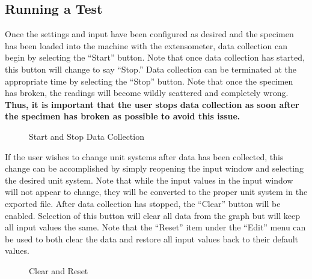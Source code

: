 \documentclass[12pt,letterpaper, USenglish]{article}
\theoremstyle{definition}
\numberwithin{theorem}{section}
\numberwithin{lemma}{section}
\numberwithin{corollary}{section}
\numberwithin{definition}{section}
\numberwithin{example}{section}
\numberwithin{equation}{theorem}
\begin{document}
\subsection{Running a Test} \label{testSection}
Once the settings and input have been configured as desired and the specimen has been loaded into the machine with the extensometer, data collection can begin by selecting the ``Start'' button. Note that once data collection has started, this button will change to say ``Stop.'' Data collection can be terminated at the appropriate time by selecting the ``Stop'' button. Note that once the specimen has broken, the readings will become wildly scattered and completely wrong. \textbf{Thus, it is important that the user stops data collection as soon after the specimen has broken as possible to avoid this issue.}
\begin{figure}[H]
    \centering
    \hspace{1em}
    \caption{Start and Stop Data Collection}
\end{figure}
If the user wishes to change unit systems after data has been collected, this change can be accomplished by simply reopening the input window and selecting the desired unit system. Note that while the input values in the input window will not appear to change, they will be converted to the proper unit system in the exported file. \label{reset}After data collection has stopped, the ``Clear'' button will be enabled. Selection of this button will clear all data from the graph but will keep all input values the same. Note that the ``Reset'' item under the ``Edit'' menu can be used to both clear the data and restore all input values back to their default values. 
\begin{figure}[H]
    \centering
    \hspace{1em}
    \caption{Clear and Reset}
\end{figure}
\end{document}
